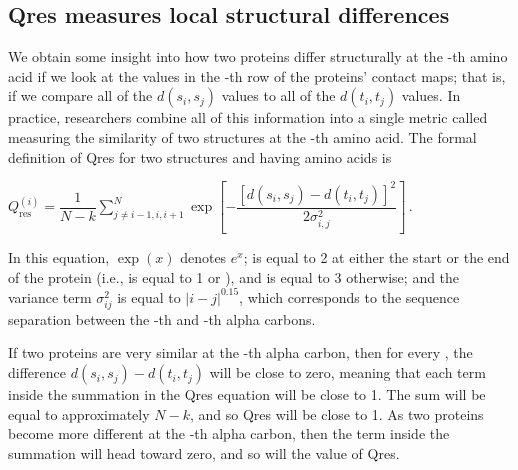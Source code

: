 \begin{qbox}\end{qbox}

\FloatBarrier
{}
\subsection{Qres measures local structural differences}

We obtain some insight into how two proteins differ structurally at the -th amino acid if we look at the values in the -th row of the proteins' contact maps; that is, if we compare all of the $d(s_{i}, s_{j})$ values to all of the $d(t_{i}, t_{j})$ values. In practice, researchers combine all of this information into a single metric called  measuring the similarity of two structures at the -th amino acid. The formal definition of Qres for two structures  and  having  amino acids is

\begin{center}
$Q_{\text{res}}^{(i)} = \dfrac{1}{N-k} \displaystyle \sum^{N}_{j\neq i-1,i,i+1} \exp\left[-\dfrac{[d(s_i,s_j)-d(t_i,t_j)]^2}{2\sigma^2_{i,j}}\right]$\,.
\end{center}

\noindent In this equation, $\exp(x)$ denotes $e^{x}$;  is equal to 2 at either the start or the end of the protein (i.e.,  is equal to 1 or ), and  is equal to 3 otherwise; and the variance term $\sigma_{ij}^2$ is equal to $\left\lvert{i-j}\right\rvert ^{0.15}$, which corresponds to the sequence separation between the -th and -th alpha carbons.\\

\begin{note}\end{note}

If two proteins are very similar at the -th alpha carbon, then for every , the difference $d(s_{i}, s_{j}) - d(t_{i}, t_{j})$ will be close to zero, meaning that each term inside the summation in the Qres equation will be close to 1. The sum will be equal to approximately $N - k$, and so Qres will be close to 1. As two proteins become more different at the -th alpha carbon, then the term inside the summation will head toward zero, and so will the value of Qres.

